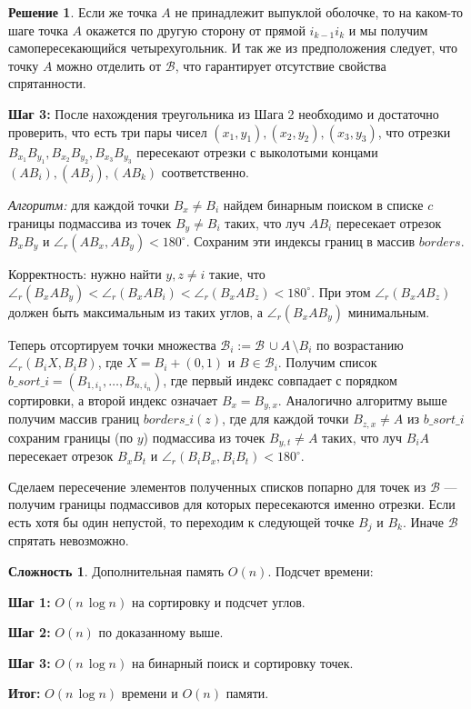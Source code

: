 \documentclass[12pt]{article}
\theoremstyle{definition}
\newtheorem*{solution}{Решение}
\newtheorem*{complexity}{Сложность}
\theoremstyle{plain}
\theoremstyle{remark}
\begin{document}
\begin{solution}
    Если же точка $A$ не принадлежит выпуклой оболочке, то на каком-то шаге точка $A$ окажется по другую сторону от прямой $i_{k-1}i_k$ и мы получим самопересекающийся четырехугольник. И так же из предположения следует, что точку $A$ можно отделить от $\mathcal{B}$, что гарантирует отсутствие свойства спрятанности.

    \textbf{Шаг 3:} После нахождения треугольника из Шага 2 необходимо и достаточно проверить, что есть три пары чисел $(x_1, y_1), (x_2, y_2), (x_3, y_3)$, что отрезки $B_{x_1}B_{y_1}, B_{x_2}B_{y_2}, B_{x_3}B_{y_3}$ пересекают отрезки с выколотыми концами $(AB_i), (AB_j), (AB_k)$ соответственно.

    \textit{Алгоритм:}
    для каждой точки $B_x \ne B_i$ найдем бинарным поиском в списке $c$ границы подмассива из точек $B_y \ne B_i$ таких, что луч $AB_i$ пересекает отрезок $B_xB_y$ и $\angle_r (AB_x, AB_y) < 180^{\circ}$. Сохраним эти индексы границ в массив $borders$.

    Корректность: нужно найти $y, z \ne i$ такие, что $\angle_r(B_xAB_y) < \angle_r(B_xAB_i) < \angle_r(B_xAB_z) < 180^{\circ}$. При этом $\angle_r(B_xAB_z)$ должен быть максимальным из таких углов, а $\angle_r(B_xAB_y)$ минимальным.

    Теперь отсортируем точки множества $\mathcal{B}_i := \mathcal{B} \, \cup A \, \setminus B_i$ по возрастанию $\angle_r (B_iX, B_iB)$, где $X = B_i + (0, 1)$ и $B \in \mathcal{B}_i$. Получим список $b\_sort\_i = (B_{1, i_1}, \ldots, B_{n, i_n})$, где первый индекс совпадает с порядком сортировки, а второй индекс означает $B_x = B_{y, x}$. Аналогично алгоритму выше получим массив границ $borders\_i(z)$, где для каждой точки $B_{z, x} \ne A$ из $b\_sort\_i$ сохраним границы (по $y$) подмассива из точек $B_{y, t} \ne A$ таких, что луч $B_iA$ пересекает отрезок $B_xB_t$ и $\angle_r (B_iB_x, B_iB_t) < 180^{\circ}$.

    Сделаем пересечение элементов полученных списков попарно для точек из $\mathcal{B}$ --- получим границы подмассивов для которых пересекаются именно отрезки. Если есть хотя бы один непустой, то переходим к следующей точке $B_j$ и $B_k$. Иначе $\mathcal{B}$ спрятать невозможно.
\end{solution}

\begin{complexity} Дополнительная память $O(n)$. Подсчет времени:

    \textbf{Шаг 1:} $O(n \, \log{n})$ на сортировку и подсчет углов.

    \textbf{Шаг 2:} $O(n)$ по доказанному выше.

    \textbf{Шаг 3:} $O(n \, \log{n})$ на бинарный поиск и сортировку точек.

    \textbf{Итог:} $O(n \, \log{n})$ времени и $O(n)$ памяти.
\end{complexity}
\end{document}
